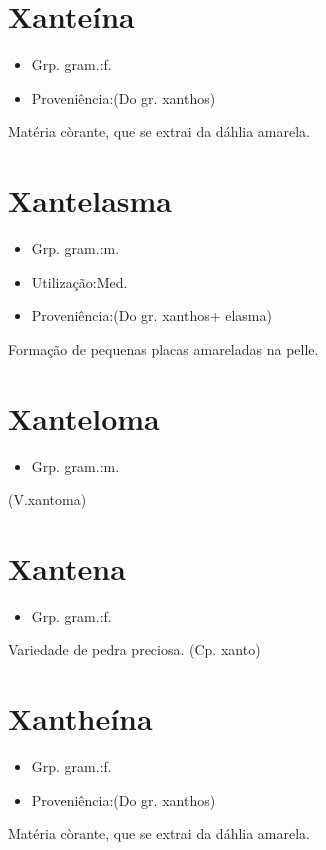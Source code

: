 \section{Xanteína}
\begin{itemize}
\item {Grp. gram.:f.}
\end{itemize}
\begin{itemize}
\item {Proveniência:(Do gr. \textunderscore xanthos\textunderscore )}
\end{itemize}
Matéria còrante, que se extrai da dáhlia amarela.
\section{Xantelasma}
\begin{itemize}
\item {Grp. gram.:m.}
\end{itemize}
\begin{itemize}
\item {Utilização:Med.}
\end{itemize}
\begin{itemize}
\item {Proveniência:(Do gr. \textunderscore xanthos\textunderscore  + \textunderscore elasma\textunderscore )}
\end{itemize}
Formação de pequenas placas amareladas na pelle.
\section{Xanteloma}
\begin{itemize}
\item {Grp. gram.:m.}
\end{itemize}
(V.xantoma)
\section{Xantena}
\begin{itemize}
\item {Grp. gram.:f.}
\end{itemize}
Variedade de pedra preciosa.
(Cp. \textunderscore xanto\textunderscore )
\section{Xantheína}
\begin{itemize}
\item {Grp. gram.:f.}
\end{itemize}
\begin{itemize}
\item {Proveniência:(Do gr. \textunderscore xanthos\textunderscore )}
\end{itemize}
Matéria còrante, que se extrai da dáhlia amarela.
